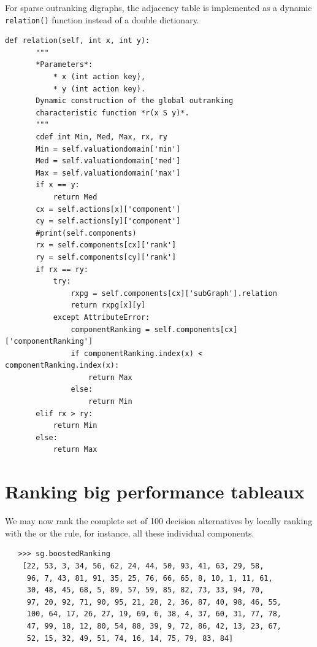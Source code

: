 For sparse outranking digraphs, the adjacency table is implemented as a dynamic \texttt{relation()} function instead of a double dictionary.

\begin{lstlisting}[caption={The \texttt{relation()} function of a sparse outranking digraph},label=list:11.4,basicstyle=\scriptsize]
   def relation(self, int x, int y):
       """
       *Parameters*:
           * x (int action key),
           * y (int action key).
       Dynamic construction of the global outranking
       characteristic function *r(x S y)*.
       """
       cdef int Min, Med, Max, rx, ry
       Min = self.valuationdomain['min']
       Med = self.valuationdomain['med']
       Max = self.valuationdomain['max']
       if x == y:
           return Med
       cx = self.actions[x]['component']
       cy = self.actions[y]['component']
       #print(self.components)
       rx = self.components[cx]['rank']
       ry = self.components[cy]['rank']
       if rx == ry:
           try:
               rxpg = self.components[cx]['subGraph'].relation
               return rxpg[x][y]
           except AttributeError:
               componentRanking = self.components[cx]['componentRanking']
               if componentRanking.index(x) < componentRanking.index(x):
                   return Max
               else:
                   return Min
       elif rx > ry:
           return Min
       else:
           return Max
\end{lstlisting}

\section{Ranking big performance tableaux}
\label{sec:12.5}

We may now rank the complete set of 100 decision alternatives by locally ranking with the \Copeland or the \NetFlows rule, for instance, all these individual components.

\begin{lstlisting}
   >>> sg.boostedRanking
    [22, 53, 3, 34, 56, 62, 24, 44, 50, 93, 41, 63, 29, 58,
     96, 7, 43, 81, 91, 35, 25, 76, 66, 65, 8, 10, 1, 11, 61,
     30, 48, 45, 68, 5, 89, 57, 59, 85, 82, 73, 33, 94, 70,
     97, 20, 92, 71, 90, 95, 21, 28, 2, 36, 87, 40, 98, 46, 55,
     100, 64, 17, 26, 27, 19, 69, 6, 38, 4, 37, 60, 31, 77, 78,
     47, 99, 18, 12, 80, 54, 88, 39, 9, 72, 86, 42, 13, 23, 67,
     52, 15, 32, 49, 51, 74, 16, 14, 75, 79, 83, 84]
\end{lstlisting}

